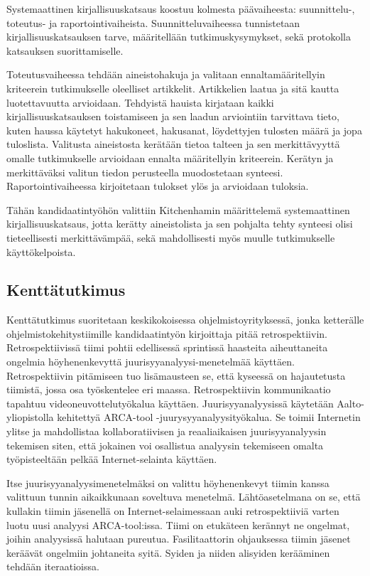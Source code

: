 Systemaattinen kirjallisuuskatsaus koostuu kolmesta päävaiheesta: suunnittelu-, toteutus- ja raportointivaiheista. Suunnitteluvaiheessa tunnistetaan kirjallisuuskatsauksen tarve, määritellään tutkimuskysymykset, sekä protokolla katsauksen suorittamiselle. 

Toteutusvaiheessa tehdään aineistohakuja ja valitaan ennaltamääritellyin kriteerein tutkimukselle oleelliset artikkelit. Artikkelien laatua ja sitä kautta luotettavuutta arvioidaan. Tehdyistä hauista kirjataan kaikki kirjallisuuskatsauksen toistamiseen ja sen laadun arviointiin tarvittava tieto, kuten haussa käytetyt hakukoneet, hakusanat, löydettyjen tulosten määrä ja jopa tuloslista. Valitusta aineistosta kerätään tietoa talteen ja sen merkittävyyttä omalle tutkimukselle arvioidaan ennalta määritellyin kriteerein. Kerätyn ja merkittäväksi valitun tiedon perusteella muodostetaan synteesi. Raportointivaiheessa kirjoitetaan tulokset ylös ja arvioidaan tuloksia.

Tähän kandidaatintyöhön valittiin Kitchenhamin määrittelemä systemaattinen kirjallisuuskatsaus, jotta kerätty aineistolista ja sen pohjalta tehty synteesi olisi tieteellisesti merkittävämpää, sekä mahdollisesti myös muulle tutkimukselle käyttökelpoista.

\subsection{Kenttätutkimus}
Kenttätutkimus suoritetaan keskikokoisessa ohjelmistoyrityksessä, jonka ketterälle ohjelmistokehitystiimille kandidaatintyön kirjoittaja pitää retrospektiivin. Retrospektiivissä tiimi pohtii edellisessä sprintissä haasteita aiheuttaneita ongelmia höyhenenkevyttä juurisyyanalyysi-menetelmää käyttäen. Retrospektiivin pitämiseen tuo lisämausteen se, että kyseessä on hajautetusta tiimistä, jossa osa työskentelee eri maassa. Retrospektiivin kommunikaatio tapahtuu videoneuvottelutyökalua käyttäen. Juurisyyanalyysissä käytetään Aalto-yliopistolla kehitettyä ARCA-tool -juurysyyanalyysityökalua. Se toimii Internetin ylitse ja mahdollistaa kollaboratiivisen ja reaaliaikaisen juurisyyanalyysin tekemisen siten, että jokainen voi osallistua analyysin tekemiseen omalta työpisteeltään pelkää Internet-selainta käyttäen.

Itse juurisyyanalyysimenetelmäksi on valittu höyhenenkevyt tiimin kanssa valittuun tunnin aikaikkunaan soveltuva menetelmä. Lähtöasetelmana on se, että kullakin tiimin jäsenellä on Internet-selaimessaan auki retrospektiiviä varten luotu uusi analyysi ARCA-tool:issa. Tiimi on etukäteen kerännyt ne ongelmat, joihin analyysissä halutaan pureutua. Fasilitaattorin ohjauksessa tiimin jäsenet keräävät ongelmiin johtaneita syitä. Syiden ja niiden alisyiden kerääminen tehdään iteraatioissa.

